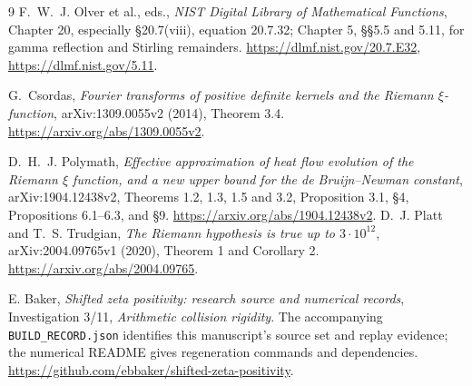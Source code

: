 \documentclass[11pt,letterpaper]{article}
\numberwithin{equation}{section}
\theoremstyle{definition}
\theoremstyle{remark}
\begin{document}
\begingroup
\small
\begin{thebibliography}{9}
F.~W.~J. Olver et al., eds.,
\emph{NIST Digital Library of Mathematical Functions},
Chapter 20, especially \S20.7(viii), equation 20.7.32;
Chapter 5, \S\S5.5 and 5.11, for gamma reflection and Stirling remainders.
\url{https://dlmf.nist.gov/20.7.E32},
\url{https://dlmf.nist.gov/5.11}.

G.~Csordas,
\emph{Fourier transforms of positive definite kernels and the Riemann
$\xi$-function}, arXiv:1309.0055v2 (2014), Theorem 3.4.
\url{https://arxiv.org/abs/1309.0055v2}.

D.~H.~J. Polymath,
\emph{Effective approximation of heat flow evolution of the Riemann
$\xi$ function, and a new upper bound for the de Bruijn--Newman constant},
arXiv:1904.12438v2, Theorems 1.2, 1.3, 1.5 and 3.2,
Proposition 3.1, \S4, Propositions 6.1--6.3, and \S9.
\url{https://arxiv.org/abs/1904.12438v2}.
D.~J. Platt and T.~S. Trudgian,
\emph{The Riemann hypothesis is true up to $3\cdot10^{12}$},
arXiv:2004.09765v1 (2020), Theorem 1 and Corollary 2.
\url{https://arxiv.org/abs/2004.09765}.

E. Baker, \emph{Shifted zeta positivity: research source and numerical
records}, Investigation 3/11, \emph{Arithmetic collision rigidity}.
The accompanying \texttt{BUILD\_RECORD.json} identifies this manuscript's
source set and replay evidence; the numerical README gives regeneration
commands and dependencies.
\url{https://github.com/ebbaker/shifted-zeta-positivity}.
\end{thebibliography}
\endgroup
\end{document}
